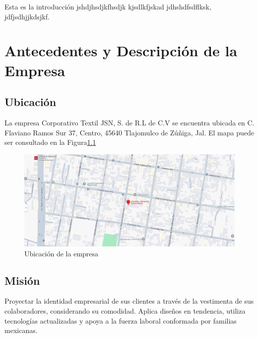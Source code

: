 \documentclass[12pt,letterpaper,spanish]{report}
\begin{document}
Esta es la introducción jshdjhsdjkfhsdjk kjsdlkfjskad jdhshdfsdflksk, jdfjsdhjjkdsjkf.



\chapter{Antecedentes y Descripción de la Empresa}
\newpage




\section{Ubicación}
La empresa Corporativo Textil JSN, S. de R.L de C.V se encuentra ubicada en C. Flaviano Ramos Sur 37, Centro, 45640 Tlajomulco de Zúñiga, Jal. El mapa puede ser consultado en la Figura\ref{a1}

\begin{figure}[htp]
  \centering
  \includegraphics*{mapajasana1.png}
  \caption{Ubicación de la empresa}\label{a1}
\end{figure}




\section{Misión}
Proyectar la identidad empresarial de sus clientes a través de la vestimenta de sus colaboradores, considerando su comodidad. Aplica diseños en tendencia, utiliza tecnologías actualizadas y apoya a la fuerza laboral conformada por familias mexicanas.
\end{document}
